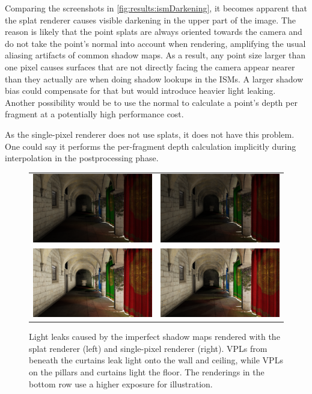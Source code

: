  Comparing the screenshots in \cref{fig:results:ismDarkening}, it becomes apparent that the splat renderer causes visible darkening in the upper part of the image. The reason is likely that the point splats are always oriented towards the camera and do not take the point's normal into account when rendering, amplifying the usual aliasing artifacts of common shadow maps. As a result, any point size larger than one pixel causes surfaces that are not directly facing the camera appear nearer than they actually are when doing shadow lookups in the ISMs. A larger shadow bias could compensate for that but would introduce heavier light leaking. Another possibility would be to use the normal to calculate a point's depth per fragment at a potentially high performance cost.

 As the single-pixel renderer does not use splats, it does not have this problem. One could say it performs the per-fragment depth calculation implicitly during interpolation in the postprocessing phase.


 \begin{figure}[htb]
 \centering
   \begin{tabular}{@{}cc@{}}
     \includegraphics[width=.22\textwidth]{../screenshots/leaks_splat} &
     \includegraphics[width=.22\textwidth]{../screenshots/leaks_single_pixel}\\
     \includegraphics[width=.22\textwidth]{../screenshots/leaks_splat_exposure} &
     \includegraphics[width=.22\textwidth]{../screenshots/leaks_single_pixel_exposure}
   \end{tabular}
   \caption{Light leaks caused by the imperfect shadow maps rendered with the splat renderer (left) and single-pixel renderer (right). VPLs from beneath the curtains leak light onto the wall and ceiling, while VPLs on the pillars and curtains light the floor. The renderings in the bottom row use a higher exposure for illustration. }
   \label{fig:results:leaks}
 \end{figure}


